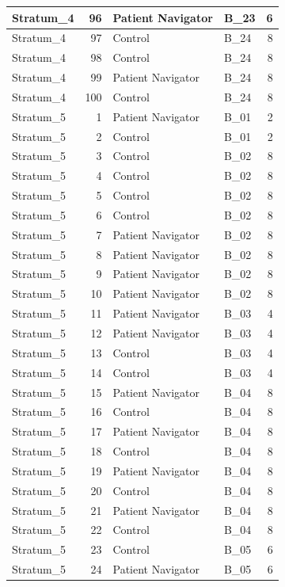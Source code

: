 \documentclass[
]{book}
\begin{document}
\begin{table}[H]
\begin{tabular}{l|r|l|l|r}
\hline
Stratum\_4 & 96 & Patient Navigator & B\_23 & 6\\
\hline
Stratum\_4 & 97 & Control & B\_24 & 8\\
\hline
Stratum\_4 & 98 & Control & B\_24 & 8\\
\hline
Stratum\_4 & 99 & Patient Navigator & B\_24 & 8\\
\hline
Stratum\_4 & 100 & Control & B\_24 & 8\\
\hline
Stratum\_5 & 1 & Patient Navigator & B\_01 & 2\\
\hline
Stratum\_5 & 2 & Control & B\_01 & 2\\
\hline
Stratum\_5 & 3 & Control & B\_02 & 8\\
\hline
Stratum\_5 & 4 & Control & B\_02 & 8\\
\hline
Stratum\_5 & 5 & Control & B\_02 & 8\\
\hline
Stratum\_5 & 6 & Control & B\_02 & 8\\
\hline
Stratum\_5 & 7 & Patient Navigator & B\_02 & 8\\
\hline
Stratum\_5 & 8 & Patient Navigator & B\_02 & 8\\
\hline
Stratum\_5 & 9 & Patient Navigator & B\_02 & 8\\
\hline
Stratum\_5 & 10 & Patient Navigator & B\_02 & 8\\
\hline
Stratum\_5 & 11 & Patient Navigator & B\_03 & 4\\
\hline
Stratum\_5 & 12 & Patient Navigator & B\_03 & 4\\
\hline
Stratum\_5 & 13 & Control & B\_03 & 4\\
\hline
Stratum\_5 & 14 & Control & B\_03 & 4\\
\hline
Stratum\_5 & 15 & Patient Navigator & B\_04 & 8\\
\hline
Stratum\_5 & 16 & Control & B\_04 & 8\\
\hline
Stratum\_5 & 17 & Patient Navigator & B\_04 & 8\\
\hline
Stratum\_5 & 18 & Control & B\_04 & 8\\
\hline
Stratum\_5 & 19 & Patient Navigator & B\_04 & 8\\
\hline
Stratum\_5 & 20 & Control & B\_04 & 8\\
\hline
Stratum\_5 & 21 & Patient Navigator & B\_04 & 8\\
\hline
Stratum\_5 & 22 & Control & B\_04 & 8\\
\hline
Stratum\_5 & 23 & Control & B\_05 & 6\\
\hline
Stratum\_5 & 24 & Patient Navigator & B\_05 & 6\\

\end{tabular}
\end{table}
\end{document}
